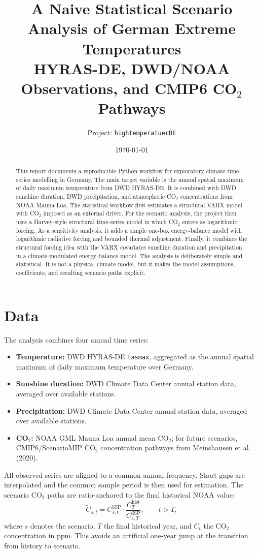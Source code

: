 \documentclass[11pt,a4paper]{article}
\title{\textbf{A Naive Statistical Scenario Analysis of German Extreme Temperatures}\\
\large HYRAS-DE, DWD/NOAA Observations, and CMIP6 CO$_2$ Pathways}
\author{Project: \texttt{hightemperatuerDE}}
\date{\today}
\begin{document}
\maketitle

\begin{abstract}
This report documents a reproducible Python workflow for exploratory climate
time-series modelling in Germany. The main target variable is the annual spatial
maximum of daily maximum temperature from DWD HYRAS-DE. It is combined with DWD
sunshine duration, DWD precipitation, and atmospheric CO$_2$ concentrations from
NOAA Mauna Loa. The statistical workflow first estimates a structural VARX model
with CO$_2$ imposed as an external driver. For the scenario analysis, the project
then uses a Harvey-style structural time-series model in which CO$_2$ enters as
logarithmic forcing. As a sensitivity analysis, it adds a simple one-box
energy-balance model with logarithmic radiative forcing and bounded thermal
adjustment. Finally, it combines the structural forcing idea with the VARX
covariates sunshine duration and precipitation in a climate-modulated
energy-balance model. The analysis is deliberately simple and statistical. It is
not a physical climate model, but it makes the model assumptions, coefficients,
and resulting scenario paths explicit.
\end{abstract}

\section{Data}

The analysis combines four annual time series:
\begin{itemize}
  \item \textbf{Temperature:} DWD HYRAS-DE \texttt{tasmax}, aggregated as the
  annual spatial maximum of daily maximum temperature over Germany.
  \item \textbf{Sunshine duration:} DWD Climate Data Center annual station data,
  averaged over available stations.
  \item \textbf{Precipitation:} DWD Climate Data Center annual station data,
  averaged over available stations.
  \item \textbf{CO$_2$:} NOAA GML Mauna Loa annual mean CO$_2$; for future
  scenarios, CMIP6/ScenarioMIP CO$_2$ concentration pathways from Meinshausen
  et al. (2020).
\end{itemize}

All observed series are aligned to a common annual frequency. Short gaps are
interpolated and the common sample period is then used for estimation. The
scenario CO$_2$ paths are ratio-anchored to the final historical NOAA value:
\begin{equation}
  \widetilde C_{s,t}
  =
  C^{\mathrm{SSP}}_{s,t}
  \cdot
  \frac{C^{\mathrm{hist}}_{T}}{C^{\mathrm{SSP}}_{s,T}},
  \qquad t > T,
\end{equation}
where $s$ denotes the scenario, $T$ the final historical year, and $C_t$ the
CO$_2$ concentration in ppm. This avoids an artificial one-year jump at the
transition from history to scenario.
\end{document}
